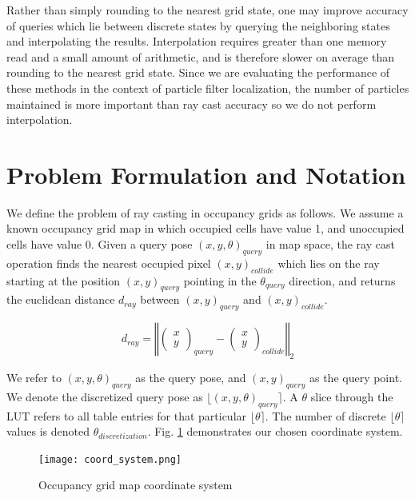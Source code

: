 \documentclass[letterpaper, 10 pt, conference]{ieeeconf}  %
\newcommand{\img}[1]{\begin{center}\texttt{[image: \{\#1]}}\end{center}}
\begin{document}
Rather than simply rounding to the nearest grid state, one may improve accuracy of queries which lie between discrete states by querying the neighboring states and interpolating the results. Interpolation requires greater than one memory read and a small amount of arithmetic, and is therefore slower on average than rounding to the nearest grid state. Since we are evaluating the performance of these methods in the context of particle filter localization, the number of particles maintained is more important than ray cast accuracy so we do not perform interpolation.

\section{Problem Formulation and Notation}

We define the problem of ray casting in occupancy grids as follows. We assume a known occupancy grid map in which occupied cells have value 1, and unoccupied cells have value 0. Given a query pose $(x,y,\theta)_{query}$ in map space, the ray cast operation finds the nearest occupied pixel $(x,y)_{collide}$ which lies on the ray starting at the position $(x,y)_{query}$ pointing in the $\theta_{query}$ direction, and returns the euclidean distance $d_{ray}$ between $(x,y)_{query}$ and $(x,y)_{collide}$.

$$ d_{ray} = \left\Vert\begin{pmatrix}
           x \\
           y 
         \end{pmatrix}_{query} - 
         \begin{pmatrix}
           x \\
           y
         \end{pmatrix}_{collide}\right\Vert_2
$$

We refer to $(x,y,\theta)_{query}$ as the query pose, and $(x,y)_{query}$ as the query point. We denote the discretized query pose as $\lfloor(x,y,\theta)_{query}\rceil$. A $\theta$ slice through the LUT refers to all table entries for that particular $\lfloor\theta\rceil$. The number of discrete $\lfloor\theta\rceil$ values is denoted $\theta_{discretization}$. Fig. \ref{coordinate_system} demonstrates our chosen coordinate system.

\begin{figure}[h!]
\begin{center}\texttt{[image: coord\_system.png]}\end{center}
\caption{Occupancy grid map coordinate system}
\label{coordinate_system}
\end{figure}
\end{document}
